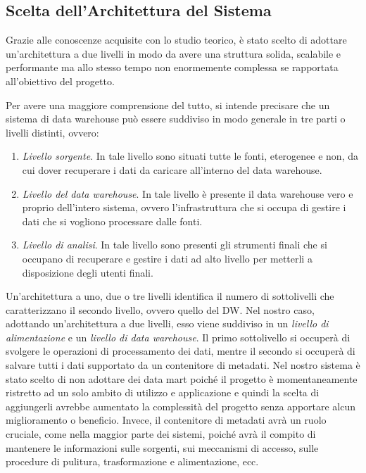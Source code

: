 \subsection{Scelta dell'Architettura del Sistema}

Grazie alle conoscenze acquisite con lo studio teorico, è stato scelto di adottare un'architettura a due livelli in modo da avere una struttura solida, scalabile e performante ma allo stesso tempo non enormemente complessa se rapportata all'obiettivo del progetto.

Per avere una maggiore comprensione del tutto, si intende precisare che un sistema di data warehouse può essere suddiviso in modo generale in tre parti o livelli distinti, ovvero:

\begin{enumerate}
    \item \textit{Livello sorgente}. In tale livello sono situati tutte le fonti, eterogenee e non, da cui dover recuperare i dati da caricare all'interno del data warehouse.
    \item \textit{Livello del data warehouse}. In tale livello è presente il data warehouse vero e proprio dell'intero sistema, ovvero l'infrastruttura che si occupa di gestire i dati che si vogliono processare dalle fonti.
    \item \textit{Livello di analisi}. In tale livello sono presenti gli strumenti finali che si occupano di recuperare e gestire i dati ad alto livello per metterli a disposizione degli utenti finali.
\end{enumerate}

Un'architettura a uno, due o tre livelli identifica il numero di sottolivelli che caratterizzano il secondo livello, ovvero quello del DW. Nel nostro caso, adottando un'architettura a due livelli, esso viene suddiviso in un \textit{livello di alimentazione} e un \textit{livello di data warehouse}. Il primo sottolivello si occuperà di svolgere le operazioni di processamento dei dati, mentre il secondo si occuperà di salvare tutti i dati supportato da un contenitore di metadati. Nel nostro sistema è stato scelto di non adottare dei data mart poiché il progetto è momentaneamente ristretto ad un solo ambito di utilizzo e applicazione e quindi la scelta di aggiungerli avrebbe aumentato la complessità del progetto senza apportare alcun miglioramento o beneficio. Invece, il contenitore di metadati avrà un ruolo cruciale, come nella maggior parte dei sistemi, poiché avrà il compito di mantenere le informazioni sulle sorgenti, sui meccanismi di accesso, sulle procedure di pulitura, trasformazione e alimentazione, ecc.

